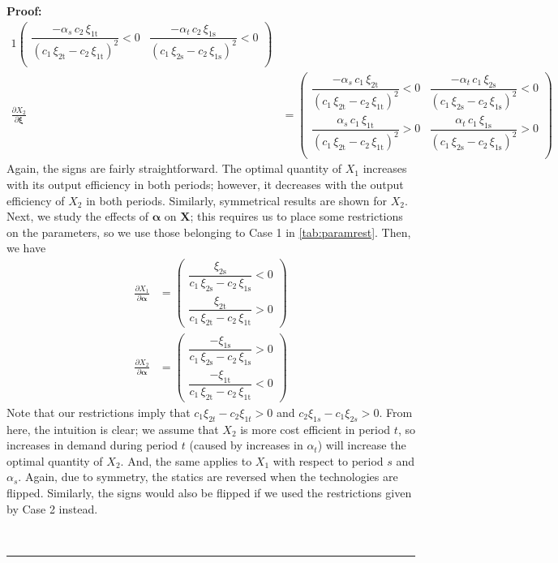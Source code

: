 \documentclass[11pt,a4paper,leqno]{extarticle}
\newenvironment{proof}[1][Proof]{\noindent\textbf{#1:} }{\ \rule{0.5em}{0.5em}}
\begin{document}
\begin{proof}
\begin{alignat*}{1}
\begin{pmatrix}
		\dfrac{-\alpha _{s}\,c_{2}\,\xi _{\mathrm{1t}}}{{\left(c_{1}\,\xi _{\mathrm{2t}}-c_{2}\,\xi _{\mathrm{1t}}\right)}^2}<0 & \dfrac{-\alpha _{t}\,c_{2}\,\xi _{\mathrm{1s}}}{{\left(c_{1}\,\xi _{\mathrm{2s}}-c_{2}\,\xi _{\mathrm{1s}}\right)}^2}<0 \\
		\end{pmatrix}\\
		\frac{\partial X_2}{\partial \boldsymbol{\xi}} &= 
		\begin{pmatrix}
		\dfrac{-\alpha _{s}\,c_{1}\,\xi _{\mathrm{2t}}}{{\left(c_{1}\,\xi _{\mathrm{2t}}-c_{2}\,\xi _{\mathrm{1t}}\right)}^2} <0& \dfrac{-\alpha _{t}\,c_{1}\,\xi _{\mathrm{2s}}}{{\left(c_{1}\,\xi _{\mathrm{2s}}-c_{2}\,\xi _{\mathrm{1s}}\right)}^2} <0\\
		\dfrac{\alpha _{s}\,c_{1}\,\xi _{\mathrm{1t}}}{{\left(c_{1}\,\xi _{\mathrm{2t}}-c_{2}\,\xi _{\mathrm{1t}}\right)}^2}>0& \dfrac{\alpha _{t}\,c_{1}\,\xi _{\mathrm{1s}}}{{\left(c_{1}\,\xi _{\mathrm{2s}}-c_{2}\,\xi _{\mathrm{1s}}\right)}^2} >0\\
		\end{pmatrix}
		\end{alignat*}
		Again, the signs are fairly straightforward. The optimal quantity of $X_1$ increases with its output efficiency in both periods; however, it decreases with the output efficiency of $X_2$ in both periods. Similarly, symmetrical results are shown for $X_2$. Next, we study the effects of $\boldsymbol{\alpha}$ on $\mathbf{X}$; this requires us to place some restrictions on the parameters, so we use those belonging to Case 1 in \autoref{tab:paramrest}. Then, we have 
		\begin{align*}
		\frac{\partial X_1}{\partial \boldsymbol{\alpha}} &= 
		\begin{pmatrix}
		\dfrac{\xi _{\mathrm{2s}}}{c_{1}\,\xi _{\mathrm{2s}}-c_{2}\,\xi _{\mathrm{1s}}}<0 \\
		\dfrac{\xi _{\mathrm{2t}}}{c_{1}\,\xi _{\mathrm{2t}}-c_{2}\,\xi _{\mathrm{1t}}}>0
		\end{pmatrix}\\
		\frac{\partial X_2}{\partial \boldsymbol{\alpha}} &= 
		\begin{pmatrix}
		\dfrac{-\xi _{\mathrm{1s}}}{c_{1}\,\xi _{\mathrm{2s}}-c_{2}\,\xi _{\mathrm{1s}}}>0 \\
		\dfrac{-\xi _{\mathrm{1t}}}{c_{1}\,\xi _{\mathrm{2t}}-c_{2}\,\xi _{\mathrm{1t}}}<0
		\end{pmatrix}
		\end{align*}
		Note that our restrictions imply that $c_1 \xi_{2t} - c_2 \xi_{1t} > 0$ and $c_2 \xi_{1s} - c_1 \xi_{2s} > 0$. From here, the intuition is clear; we assume that $X_2$ is more cost efficient in period $t$, so increases in demand during period $t$ (caused by increases in $\alpha_t$) will increase the optimal quantity of $X_2$. And, the same applies to $X_1$ with respect to period $s$ and $\alpha_s$. Again, due to symmetry, the statics are reversed when the technologies are flipped. Similarly, the signs would also be flipped if we used the restrictions given by Case 2 instead. 
		

\end{proof}
\end{document}
